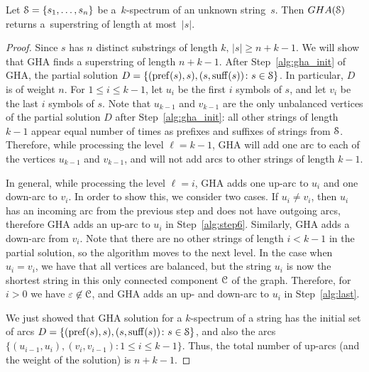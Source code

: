 \begin{lemma}
Let ${\cal S}=\{s_1,\ldots,s_n\}$ be a~$k$-spectrum of an unknown string~$s$. Then $GHA({\cal S})$ returns a~superstring of length at most~$|s|$.
\end{lemma}

\begin{proof}
Since $s$ has $n$ distinct substrings of length $k, \, |s|\geq n+k-1$. We will show that GHA finds a superstring of length $n+k-1$. After Step~\ref{alg:gha_init} of GHA, the partial solution $D = \{(\operatorname{pref}(s), s), (s, \operatorname{suff}(s)) \colon s \in {\cal S}\}$. In particular, $D$ is of weight $n$. For $1\leq i\leq k-1$, let $u_{i}$ be the first $i$ symbols of $s$, and let $v_{i}$ be the last $i$ symbols of $s$. Note that $u_{k-1}$ and $v_{k-1}$ are the only unbalanced vertices of the partial solution $D$ after Step~\ref{alg:gha_init}: all other strings of length $k-1$ appear equal number of times as prefixes and suffixes of strings from ${\cal S}$. Therefore, while processing the level $\ell=k-1$, GHA will add one arc to each of the vertices $u_{k-1}$ and $v_{k-1}$, and will not add arcs to other strings of length $k-1$. 

In general, while processing the level $\ell=i$, GHA adds one up-arc to $u_i$ and one down-arc to $v_i$. In order to show this, we consider two cases. If $u_i \neq v_i$, then $u_i$ has an incoming arc from the previous step and does not have outgoing arcs, therefore GHA adds an up-arc to $u_i$ in Step~\ref{alg:step6}. Similarly, GHA adds a down-arc from $v_i$. Note that there are no other strings of length $i<k-1$ in the partial solution, so the algorithm moves to the next level. In the case when $u_i=v_i$, we have that all vertices are balanced, but the string $u_i$ is now the shortest string in this only connected component ${\cal C}$ of the graph. Therefore, for $i>0$ we have $\varepsilon\not\in{\cal C}$, and GHA adds an up- and down-arc to $u_i$ in Step~\ref{alg:last}. 

We just showed that GHA solution for a $k$-spectrum of a string has the initial set of arcs  $D = \{(\operatorname{pref}(s), s), (s, \operatorname{suff}(s)) \colon s \in {\cal S}\}$, and also the arcs $\{ (u_{i-1}, u_{i}), (v_i, v_{i-1})\colon 1\leq i\leq k-1 \}$. Thus, the total number of up-arcs (and the weight of the solution) is $n+k-1$.
\end{proof}

